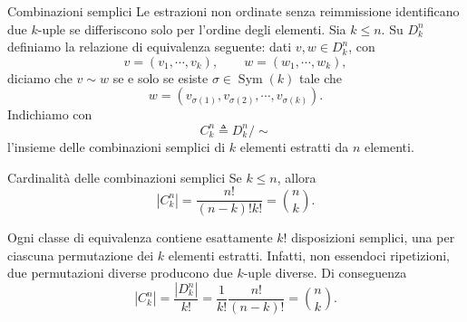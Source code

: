 \documentclass[a4paper]{article}
\begin{document}
\begin{snippetdefinition}{Combinazioni semplici}
    Le estrazioni non ordinate senza reimmissione identificano due \(k\)-uple se differiscono solo per l'ordine degli elementi.
    Sia \(k\leq n\).
    Su \(D_k^n\) definiamo la relazione di equivalenza seguente: dati
    \(v,w\in D_k^n\), con
    \[
        v=(v_1,\cdots,v_k),
        \qquad
        w=(w_1,\cdots,w_k),
    \]
    diciamo che \(v\sim w\) se e solo se esiste \(\sigma\in\operatorname{Sym}(k)\) tale che
    \[
        w=(v_{\sigma(1)},v_{\sigma(2)},\cdots,v_{\sigma(k)}).
    \]
    Indichiamo con
    \[
        C_k^n \triangleq D_k^n/{\sim}
    \]
    l'insieme delle combinazioni semplici di \(k\) elementi estratti da \(n\) elementi.
\end{snippetdefinition}

\begin{snippetproposition}{Cardinalità delle combinazioni semplici}
    Se \(k\leq n\), allora
    \[
        |C_k^n|
        =
        \frac{n!}{(n-k)!k!}
        =
        \binom{n}{k}.
    \]
\end{snippetproposition}

\begin{snippetproof}{}
    Ogni classe di equivalenza contiene esattamente \(k!\) disposizioni semplici, una per ciascuna permutazione dei \(k\) elementi estratti.
    Infatti, non essendoci ripetizioni, due permutazioni diverse producono due \(k\)-uple diverse.
    Di conseguenza
    \[
        |C_k^n|
        =
        \frac{|D_k^n|}{k!}
        =
        \frac{1}{k!}\frac{n!}{(n-k)!}
        =
        \binom{n}{k}.
    \]
\end{snippetproof}
\end{document}
